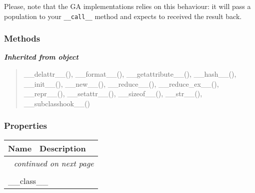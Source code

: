 Please, note that the GA implementations relies on this behaviour: it will
pass a population to your \texttt{\_\_call\_\_} method and expects to received the
result back.


  \subsubsection{Methods}


\large{\textbf{\textit{Inherited from object}}}

\begin{quote}
\_\_delattr\_\_(), \_\_format\_\_(), \_\_getattribute\_\_(), \_\_hash\_\_(), \_\_init\_\_(), \_\_new\_\_(), \_\_reduce\_\_(), \_\_reduce\_ex\_\_(), \_\_repr\_\_(), \_\_setattr\_\_(), \_\_sizeof\_\_(), \_\_str\_\_(), \_\_subclasshook\_\_()
\end{quote}


  \subsubsection{Properties}

    \vspace{-1cm}
\hspace{\varindent}\begin{longtable}{|p{\varnamewidth}|p{\vardescrwidth}|l}
\cline{1-2}
\cline{1-2} \centering \textbf{Name} & \centering \textbf{Description}& \\
\cline{1-2}
\endhead\cline{1-2}\multicolumn{3}{r}{\small\textit{continued on next page}}\\\endfoot\cline{1-2}
\endlastfoot\multicolumn{2}{|l|}{\textit{Inherited from object}}\\
\multicolumn{2}{|p{\varwidth}|}{\raggedright \_\_class\_\_}\\
\cline{1-2}
\end{longtable}


